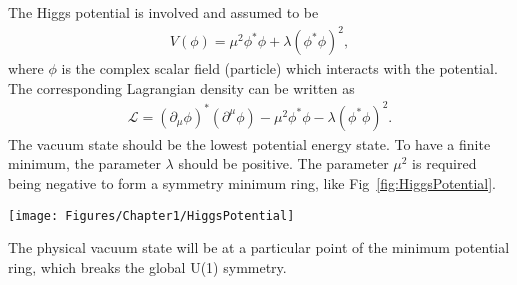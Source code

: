 The Higgs potential is involved and assumed to be
\begin{equation} \label{eq:HiggsPotential}
  \begin{aligned}
	V(\phi) = \mu^{2}\phi^{*}\phi + \lambda(\phi^{*}\phi)^{2},
  \end{aligned}
\end{equation}
where $\phi$ is the complex scalar field (particle) which interacts with the potential.
The corresponding Lagrangian density can be written as
\begin{equation} \label{eq:HiggsL}
  \begin{aligned}
	\mathcal{L} = (\partial_{\mu}\phi)^{*}(\partial^{\mu}\phi)-\mu^{2}\phi^{*}\phi-\lambda(\phi^{*}\phi)^{2}.
  \end{aligned}
\end{equation}
The vacuum state should be the lowest potential energy state.
To have a finite minimum, the parameter $\lambda$ should be positive.
The parameter $\mu^{2}$ is required being negative to form a symmetry minimum ring, like Fig~\ref{fig:HiggsPotential}.
\begin{figure*}[h]
  \centering
  \texttt{[image: Figures/Chapter1/HiggsPotential]}
  \caption{The structure of the Higgs potential for a complex scalar field $\phi = \phi_{1}+i\phi_{2}$.~\cite{Thomson:2013zua}}
  \label{fig:HiggsPotential}
\end{figure*}
The physical vacuum state will be at a particular point of the minimum potential ring, which breaks the global U(1) symmetry.

